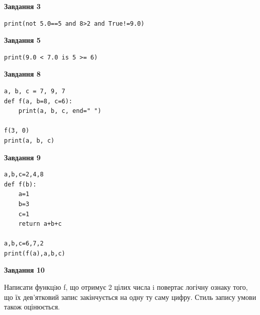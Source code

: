 \documentclass[12pt, ukrainian]{article}
\begin{document}
{\begin {large}
\begin{minipage}[t]{7.5cm}
\end{minipage}
\vline \hspace{6mm}
\begin{minipage}[t]{10.5cm}

\begin{center}
\textbf{Завдання 3}
\end{center}

\begin{verbatim}
print(not 5.0==5 and 8>2 and True!=9.0)
\end{verbatim}



\begin{center}
\textbf{Завдання 5}
\end{center}

\begin{verbatim}
print(9.0 < 7.0 is 5 >= 6)
\end{verbatim}



\begin{center}
\textbf{Завдання 8}
\end{center}

\begin{verbatim}
a, b, c = 7, 9, 7
def f(a, b=8, c=6):
    print(a, b, c, end=" ")

f(3, 0)
print(a, b, c)
\end{verbatim}



\begin{center}
\textbf{Завдання 9}
\end{center}

\begin{verbatim}
a,b,c=2,4,8
def f(b):
    a=1
    b=3
    c=1
    return a+b+c

a,b,c=6,7,2
print(f(a),a,b,c)
\end{verbatim}



\begin{center}
\textbf{Завдання 10}
\end{center}

Написати функцiю f, що отримує 2 цілих числа i повертає логічну ознаку того, що їх дев'ятковий запис закінчується на одну ту саму цифру. Стиль запису умови також оцінюється.\par

\end{minipage}

\end {large}}
\newpage
\end{document}
